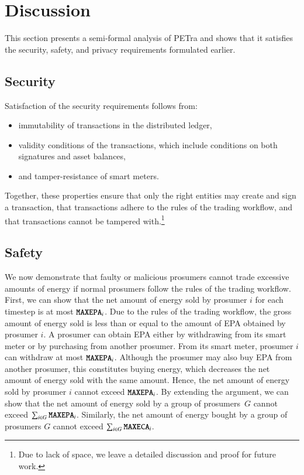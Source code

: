 \section{Discussion}
\label{sec:discussion}

This section presents a semi-formal analysis of PETra and shows that
it satisfies the security, safety, and privacy requirements formulated
earlier.

\subsection{Security}
Satisfaction of the security requirements follows from:
\begin{itemize}[noitemsep,topsep=-\parskip]
\item immutability of transactions in the distributed ledger,
\item validity conditions of the transactions, which include
  conditions on both signatures and asset balances,
\item and tamper-resistance of smart meters.
\end{itemize}
Together, these properties ensure that only the right entities may
create and sign a transaction, that transactions adhere to the rules
of the trading workflow, and that transactions cannot be tampered
with.\footnote{Due to lack of space, we leave a detailed discussion
  and proof for future work.}

\subsection{Safety}
We now demonstrate that faulty or malicious prosumers cannot trade
excessive amounts of energy if normal prosumers follow the rules of
the trading workflow.  First, we can show that the net amount of
energy sold by prosumer $i$ for each timestep is at most
$\texttt{MAXEPA}_i$.  Due to the rules of the trading workflow, the gross amount of energy sold is less than or equal to the amount of EPA
obtained by prosumer $i$.
%
A prosumer can obtain EPA either by withdrawing from its smart meter
or by purchasing from another prosumer.  From its smart meter,
prosumer $i$ can withdraw at most $\texttt{MAXEPA}_i$.  Although the
prosumer may also buy EPA from another prosumer, this constitutes
buying energy, which decreases the net amount of energy sold with the
same amount.  Hence, the net amount of energy sold by prosumer $i$
cannot exceed $\texttt{MAXEPA}_i$.  By extending the argument, we can
show that the net amount of energy sold by a group of prosumers~$G$
cannot exceed $\sum_{i \in G} \texttt{MAXEPA}_i$.  Similarly, %
 the net amount of energy bought by a group of prosumers $G$
cannot exceed $\sum_{i \in G} \texttt{MAXECA}_i$.

